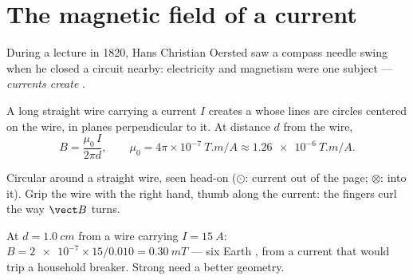 \section{The magnetic field of a current}

\begin{remark}[Oersted, 1820]\label{rem:g11:magnetic-fields:oersted}
During a lecture in 1820, Hans Christian Oersted saw a compass needle
swing when he closed a circuit nearby: electricity and magnetism were
one subject --- \emph{currents create }.
\end{remark}

\begin{proposition}\label{prop:g11:magnetic-fields:wire}
A long straight wire carrying a current $I$ creates a  whose
lines are circles centered on the wire, in planes perpendicular to it.
At distance $d$ from the wire,
\[
B = \frac{\mu_0\, I}{2\pi d},
\qquad \mu_0 = 4\pi\times 10^{-7}\ \unit{T.m/A} \approx \qty{1.26e-6}{T.m/A}.
\]
\end{proposition}
\admitted

\begin{omfigure}
\qquad\qquad
{}

{\small Circular  around a straight wire, seen head-on
($\odot$: current out of the page; $\otimes$: into it). Grip the wire
with the right hand, thumb along the current: the fingers curl the way
$\vect B$ turns.}
\end{omfigure}

\begin{example}\label{ex:g11:magnetic-fields:wire}
At $d = \qty{1.0}{cm}$ from a wire carrying $I = \qty{15}{A}$:
$B = \num{2e-7} \times 15 / 0.010 = \qty{0.30}{mT}$ --- six Earth
, from a current that would trip a household breaker. Strong
 need a better geometry.
\end{example}

